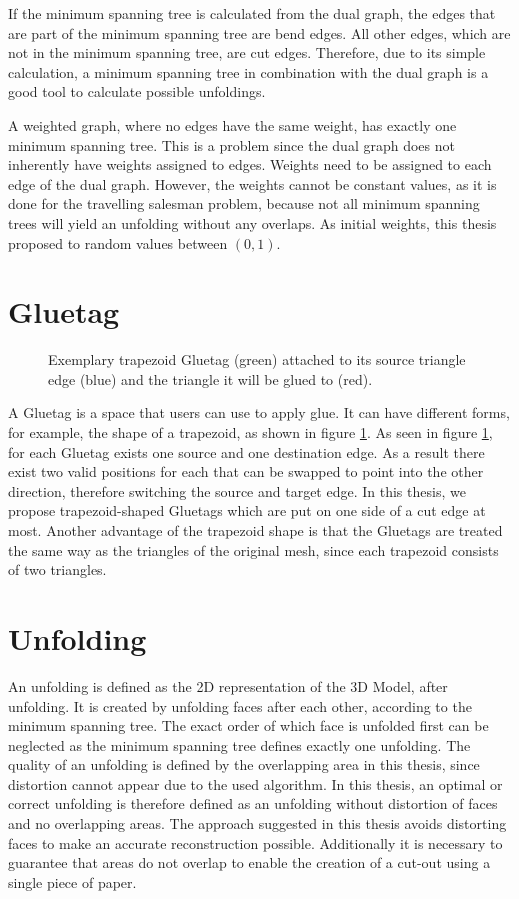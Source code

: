 \documentclass[draft,final]{vutinfth} %
\begin{document}
If the minimum spanning tree is calculated from the dual graph, the edges that are part of the minimum spanning tree are bend edges. All other edges, which are not in the minimum spanning tree, are cut edges. Therefore, due to its simple calculation, a minimum spanning tree in combination with the dual graph is a good tool to calculate possible unfoldings. 

A weighted graph, where no edges have the same weight, has exactly one minimum spanning tree. This is a problem since the dual graph does not inherently have weights assigned to edges. Weights need to be assigned to each edge of the dual graph. However, the weights cannot be constant values, as it is done for the travelling salesman problem, because not all minimum spanning trees will yield an unfolding without any overlaps. 
As initial weights, this thesis proposed to random values between $(0,1)$.

\section{Gluetag}
\begin{figure}

\caption{Exemplary trapezoid Gluetag (green) attached to its source triangle edge (blue) and the triangle it will be glued to (red).}
\label{fig:Gluetag}
\end{figure}

A Gluetag is a space that users can use to apply glue. It can have different forms, for example, the shape of a trapezoid, as shown in figure \ref{fig:Gluetag}. As seen in figure \ref{fig:Gluetag}, for each Gluetag exists one source and one destination edge. As a result there exist two valid positions for each that can be swapped to point into the other direction, therefore switching the source and target edge. In this thesis, we propose trapezoid-shaped Gluetags which are put on one side of a cut edge at most. Another advantage of the trapezoid shape is that the Gluetags are treated the same way as the triangles of the original mesh, since each trapezoid consists of two triangles.

\section{Unfolding}
An unfolding is defined as the 2D representation of the 3D Model, after unfolding. It is created by unfolding faces after each other, according to the minimum spanning tree. The exact order of which face is unfolded first can be neglected as the minimum spanning tree defines exactly one unfolding. The quality of an unfolding is defined by the overlapping area in this thesis, since distortion cannot appear due to the used algorithm. In this thesis, an optimal or correct unfolding is therefore defined as an unfolding without distortion of faces and no overlapping areas. The approach suggested in this thesis avoids distorting faces to make an accurate reconstruction possible. Additionally it is necessary to guarantee that areas do not overlap to enable the creation of a cut-out using a single piece of paper.
\end{document}
